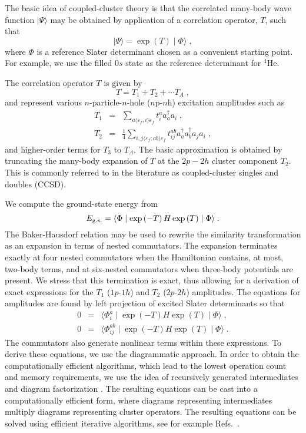 \documentclass[fleqn,12pt,twoside]{article}
\begin{document}
The basic idea of coupled-cluster theory is that the correlated many-body
wave function $\mid \Psi\rangle$ 
may be obtained by application of a correlation operator, 
$T$, such that
\begin{equation}
\mid\Psi \rangle =\exp\left(T\right)\mid\Phi\rangle\;,
\end{equation}
where $\Phi$ is a reference Slater determinant chosen as a convenient starting
point.  For example, we use the filled $0s$ state as the reference 
determinant for $^4$He.

The correlation operator $T$ is given by
\begin{equation}
T=T_1 + T_2 + \cdots T_A\;,
\end{equation}
and represent various
$n$-particle-$n$-hole ($n$p-$n$h) excitation amplitudes such as
\begin{eqnarray}
T_1 &=& \sum_{a\langle\varepsilon_f, i\rangle\varepsilon_f}t^a_i a^\dagger_a a_i\;, \\
T_2 &=& \frac{1}{4}\sum_{i,j\langle\varepsilon_f; ab \rangle \varepsilon_f}t^{ab}_{ij}
a^\dagger_a a^\dagger_b a_j a_i\;,
\end{eqnarray}
and higher-order terms for $T_3$ to $T_A$.  
The basic approximation is obtained by truncating the many-body
expansion of $T$ at the $2p-2h$ cluster component $T_{2}$.
This is
commonly referred to in the literature as coupled-cluster singles and
doubles (CCSD).


We compute the ground-state energy from
\begin{equation}
E_{\rm g.s.}=\langle\Phi\mid \exp\left(-T\right) H \exp\left(T\right)
\mid\Phi\rangle\;. 
\end{equation}
The Baker-Hausdorf relation may be used to rewrite the similarity
transformation as an expansion in terms of nested commutators. 
The expansion terminates exactly at four nested commutators  when
the Hamiltonian contains, at most, two-body terms, and at six-nested 
commutators when  three-body potentials are present. 
We stress that
this termination is exact, thus allowing for a derivation of exact
expressions for the $T_1$ ($1p$-$1h$) and 
$T_2$ ($2p$-$2h$) amplitudes. 
The equations for amplitudes are found by left projection of
excited Slater determinants
so that
\begin{eqnarray}
0 &=& \langle\Phi_i^a\mid 
\exp\left(-T\right) H \exp\left(T\right) \mid \Phi\rangle\;,  \nonumber \\ 
0 &=& \langle\Phi_{ij}^{ab}\mid 
\exp\left(-T\right) H \exp\left(T\right) \mid \Phi\rangle \;.
\label{project_eqns}
\end{eqnarray}
The commutators also generate nonlinear terms within these expressions. 
To derive these equations, we use the diagrammatic approach.
In order to obtain the computationally efficient algorithms,
which lead to the lowest operation count and memory requirements,
we use the idea of recursively generated intermediates and
diagram factorization \cite{Bartlett95}.
The resulting equations can be cast into a computationally
efficient form, where diagrams representing intermediates multiply
diagrams representing cluster operators. The resulting equations
can be solved using efficient iterative algorithms, 
see for example Refs.~\cite{Bartlett95,ref1}.
\end{document}
